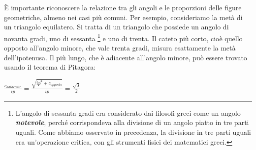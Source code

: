È importante riconoscere la relazione tra gli angoli e le proporzioni delle figure geometriche, almeno nei casi più comuni.\newline
Per esempio, consideriamo la metà di un triangolo equilatero. Si tratta di un triangolo che possiede un angolo di novanta gradi, uno di sessanta \footnote{
L'angolo di sessanta gradi era considerato dai filosofi greci come un angolo {\bf \slshape notevole}, perché corrispondeva alla divisione di un angolo piatto in tre parti uguali. Come abbiamo osservato in precedenza, la divisione in tre parti uguali era un'operazione critica, con gli strumenti fisici dei matematici greci.} e uno di trenta.\newline
Il cateto più corto, cioè quello opposto all'angolo minore, che vale trenta gradi, misura esattamente la metà dell'ipotenusa.\newline
Il più lungo, che è adiacente all'angolo minore, può essere trovato usando il teorema di Pitagora:
\begin{center}
\begin{math}
\frac {c_{adiacente}} {ip}=\frac {\sqrt{{ip}^2 + c_{opposto}}} {ip} = \frac {\sqrt{3}} 2
\end{math}
\end{center}


